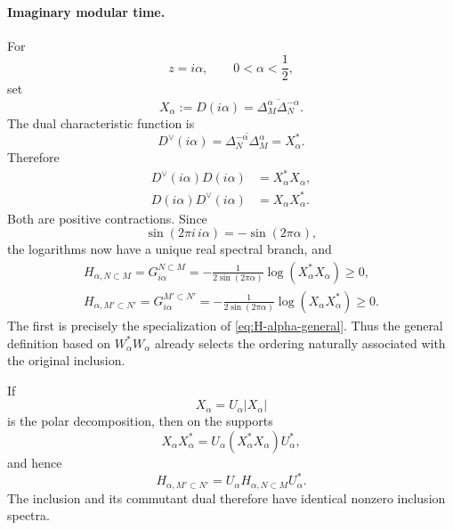\documentclass[a4paper,11pt]{article}
\theoremstyle{definition}
\begin{document}
\paragraph{Imaginary modular time.}
For
\begin{equation}
    z=i\alpha,
    \qquad
    0<\alpha<\frac12,
\end{equation}
set
\begin{equation}
    X_\alpha
    :=
    D(i\alpha)
    =
    \overline{
    \Delta_M^\alpha
    \Delta_N^{-\alpha}} .
    \label{eq:X-alpha-common}
\end{equation}
The dual characteristic function is
\begin{equation}
    D^\vee(i\alpha)
    =
    \overline{
    \Delta_N^{-\alpha}
    \Delta_M^\alpha}
    =
    X_\alpha^* .
    \label{eq:Ddual-alpha-common}
\end{equation}
Therefore
\begin{align}
    D^\vee(i\alpha)D(i\alpha)
    &=
    X_\alpha^*X_\alpha,
    \label{eq:XX-original}
    \\
    D(i\alpha)D^\vee(i\alpha)
    &=
    X_\alpha X_\alpha^* .
    \label{eq:XX-dual}
\end{align}
Both are positive contractions. Since
\begin{equation}
    \sin(2\pi i\,i\alpha)
    =
    -\sin(2\pi\alpha),
\end{equation}
the logarithms now have a unique real spectral branch, and
\begin{align}
    \boxed{
    H_{\alpha,N\subset M}
    =
    G_{i\alpha}^{N\subset M}
    =
    -\frac{1}{2\sin(2\pi\alpha)}
    \log(X_\alpha^*X_\alpha)
    \geq0,
    }
    \label{eq:Halpha-original-common}
    \\
    \boxed{
    H_{\alpha,M'\subset N'}
    =
    G_{i\alpha}^{M'\subset N'}
    =
    -\frac{1}{2\sin(2\pi\alpha)}
    \log(X_\alpha X_\alpha^*)
    \geq0.
    }
    \label{eq:Halpha-dual-common}
\end{align}
The first is precisely the specialization of
\eqref{eq:H-alpha-general}. Thus the general definition based on
$W_\alpha^*W_\alpha$ already selects the ordering naturally associated with
the original inclusion.

If
\begin{equation}
    X_\alpha
    =
    U_\alpha|X_\alpha|
\end{equation}
is the polar decomposition, then on the supports
\begin{equation}
    X_\alpha X_\alpha^*
    =
    U_\alpha
    (X_\alpha^*X_\alpha)
    U_\alpha^*,
\end{equation}
and hence
\begin{equation}
    \boxed{
    H_{\alpha,M'\subset N'}
    =
    U_\alpha
    H_{\alpha,N\subset M}
    U_\alpha^* .
    }
    \label{eq:H-dual-polar}
\end{equation}
The inclusion and its commutant dual therefore have identical nonzero
inclusion spectra.
\end{document}
